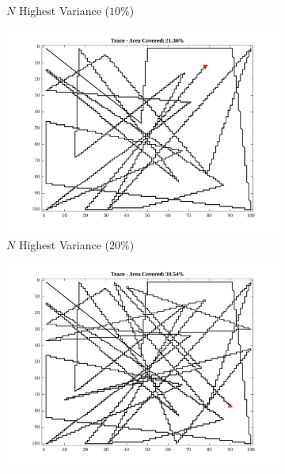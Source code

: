 \begin{figure}[htb!]
\begin{subfigure}[t]{0.32\textwidth}
        \caption{$N$ Highest Variance ($10\%$)}
    \end{subfigure}%
    \begin{subfigure}[t]{0.32\textwidth}
        \centering
        \includegraphics[width=\linewidth]{figures/hbresults/path_nnhv_20p_100x100_sf_50_seed_2.png}
        \ssp
        \captionsetup{skip=0.20\baselineskip,size=footnotesize}
        \caption{$N$ Highest Variance ($20\%$)}
    \end{subfigure}%
    \begin{subfigure}[t]{0.32\textwidth}
        \centering
        \includegraphics[width=\linewidth]{figures/hbresults/path_nnhv_30p_100x100_sf_50_seed_2.png}
        \ssp
        \captionsetup{skip=0.20\baselineskip,size=footnotesize}

\end{subfigure}
\end{figure}
